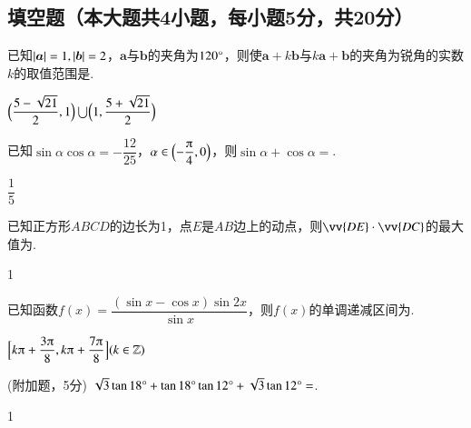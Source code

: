 \begin{exercise}
  \section{填空题（本大题共4小题，每小题5分，共20分）}
    \item%
       已知$\left| \bm a \right|=1,\left| \bm b \right|=2$，$\bm a$与$\bm b$的夹角为$120\degree$，则使$\bm a+k\bm b$与$k\bm a+\bm b$的夹角为锐角的实数$k$的取值范围是\tk[5].
      \begin{answer}
        $\Bigl(\dfrac{5-\sqrt{21}}2,1\Bigr)\bigcup\Bigl(1,\dfrac{5+\sqrt{21}}2\Bigr)$
      \end{answer}
    \item%
      已知$\sin\alpha\cos\alpha=-\dfrac{12}{25}$，$\alpha\in\Bigl(-\dfrac{\piup}4,0\Bigr)$，则$\sin\alpha+\cos\alpha=$\tk.
      \begin{answer}
        $\dfrac{1}{5}$
      \end{answer}
    \item%
       已知正方形$ABCD$的边长为1，点$E$是$AB$边上的动点，则$\vv{DE}\cdot\vv{DC}$的最大值为\tk.
       \begin{answer}
         1
       \end{answer}
    \item%
       已知函数$f(x)=\dfrac{(\sin x-\cos x)\sin {2x}}{\sin x}$，则$f(x)$的单调递减区间为\tk[6].
      \begin{answer}
        $\Bigl[k\piup+\dfrac{3\piup}8,k\piup+\dfrac{7\piup}8\Bigr](k\in\mathbb{Z})$
      \end{answer}
    \item%
      (附加题，5分)
      $\sqrt3\tan{18\degree}+\tan{18\degree}\tan{12\degree}+\sqrt3\tan{12\degree}=$\tk.
      \begin{answer}
        1
      \end{answer}

\end{exercise}
